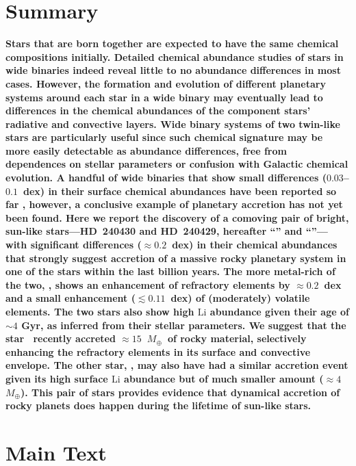 \documentclass[12pt,letterpaper,margin=1in]{article}
\newcommand*\elem[1]{\ensuremath{\mathrm{#1}}}
\newcommand{\sunanalog}{\text{Krios}}
\newcommand{\bizarreone}{\text{Kronos}}
\newcommand{\mearth}{\ensuremath{M_\oplus}}
\begin{document}
\section{Summary}
{\bf \noindent
  Stars that are born together are expected to have the same chemical
  compositions initially.
  Detailed chemical abundance studies of stars in wide binaries indeed reveal
  little to no abundance differences in most
  cases\citep{Gratton:2001aa,Desidera:2004aa}.
  However, the formation and evolution of different planetary systems around
  each star in a wide binary may eventually lead to differences in the chemical
  abundances of the component stars' radiative and convective
  layers\cite{Pinsonneault:2001aa,Chambers:2010aa}.
  Wide binary systems of two twin-like stars are particularly useful since such
  chemical signature may be more easily detectable as abundance differences,
  free from dependences on stellar parameters or confusion with Galactic
  chemical evolution.
  A handful of wide binaries that show small differences ($0.03$--$0.1$~dex)
  in their surface chemical abundances have been reported so far
  \cite{Mack:2014aa,Mack:2016aa,Saffe:2015aa,Teske:2013aa,
    Teske:2015aa,Teske:2016aa,Teske:2016ab,Biazzo:2015aa,Ramirez:2015aa},
  however, a conclusive example of planetary accretion has not yet been found.
  Here we report the discovery of a comoving pair of bright, sun-like
  stars---HD~240430 and HD~240429, hereafter ``\bizarreone'' and
  ``\sunanalog''--- with significant differences ($\approx 0.2$~dex) in their
  chemical abundances that strongly suggest accretion of a massive rocky
  planetary system in one of the stars within the last billion years.
  The more metal-rich of the two, \bizarreone, shows an enhancement of refractory
  elements by $\approx 0.2$~dex and a small enhancement ($\lesssim 0.11$~dex) of
  (moderately) volatile elements.
  The two stars also show high \elem{Li} abundance given their age of $\sim 4$ Gyr,
  as inferred from their stellar parameters.
  We suggest that the star \bizarreone\ recently accreted
  $\approx 15$~\mearth\ of rocky material, selectively enhancing the
  refractory elements in its surface and convective envelope.
  The other star, \sunanalog, may also have had a similar accretion
  event given its high surface \elem{Li} abundance but of much smaller amount
  ($\approx 4$~\mearth).
  This pair of stars provides evidence that dynamical accretion of rocky planets
  does happen during the lifetime of sun-like stars.
}

\section{Main Text}
\end{document}
